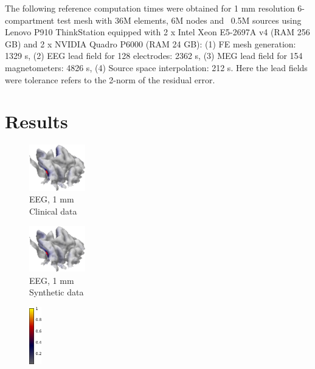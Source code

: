 \documentclass[5p]{elsarticle}
\begin{document}
The following reference computation times were obtained for 1 mm resolution 6-compartment test mesh with 36M elements, 6M nodes and ~0.5M sources using Lenovo P910 ThinkStation equipped with 2 x Intel Xeon E5-2697A v4 (RAM 256 GB) and 2 x NVIDIA Quadro P6000 (RAM 24 GB): (1) FE mesh generation: 1329 s, (2) EEG lead field for 128 electrodes: 2362 s, (3) MEG lead field for 154 magnetometers: 4826 s, (4) Source space interpolation: 212 s. Here the lead fields were tolerance refers to the 2-norm of the residual error.  

\section{Results}

\begin{figure}[h!]
\begin{footnotesize}
\begin{center}
\begin{minipage}{3cm} \begin{center}
\includegraphics[height=2.0cm]{MAP_EEG_G_1mm.png} \\ EEG, 1 mm \\ Clinical data
\end{center}\end{minipage}
\begin{minipage}{3cm} \begin{center}
\includegraphics[height=2.0cm]{MAP_EEG_G_1mm_syntheticdata.png} \\ EEG, 1 mm \\ Synthetic data
\end{center}\end{minipage}\begin{minipage}{0.5cm} \begin{center}
\includegraphics[height=2.5cm]{colorbar.png} \\ \mbox{}  \\ \mbox{}

\end{center}
\end{minipage}
\end{center}
\end{footnotesize}
\end{figure}
\end{document}
